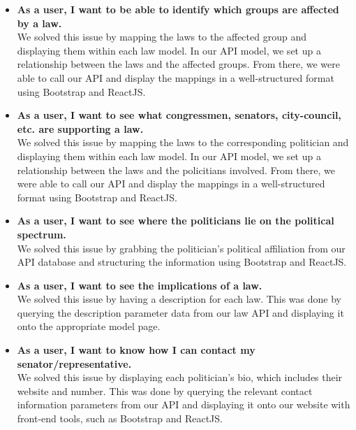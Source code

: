 \documentclass[12pt]{article}
\begin{document}
\begin{itemize}
	\item\textbf{As a user, I want to be able to identify which groups are affected by a law.} \\
	We solved this issue by mapping the laws to the affected group and displaying them within each law model. In our API model, we set up a relationship between the laws and the affected groups. From there, we were able to call our API and display the mappings in a well-structured format using Bootstrap and ReactJS.
	\\
	
	\item\textbf{As a user, I want to see what congressmen, senators, city-council, etc. are supporting a law.} \\
	We solved this issue by mapping the laws to the corresponding politician and displaying them within each law model. In our API model, we set up a relationship between the laws and the policitians involved. From there, we were able to call our API and display the mappings in a well-structured format using Bootstrap and ReactJS.
	\\
	
	\item\textbf{As a user, I want to see where the politicians lie on the political spectrum.} \\
	We solved this issue by grabbing the politician's political affiliation from our API database and structuring the information using Bootstrap and ReactJS.
	\\
	
	\item\textbf{As a user, I want to see the implications of a law.} \\
	We solved this issue by having a description for each law. This was done by querying the description parameter data from our law API and displaying it onto the appropriate model page. 
	\\
	
	\item\textbf{As a user, I want to know how I can contact my senator/representative.} \\
	We solved this issue by displaying each politician's bio, which includes their website and number. This was done by querying the relevant contact information parameters from our API and displaying it onto our website with front-end tools, such as Bootstrap and ReactJS.
	
\end{itemize} ~\\
\end{document}
